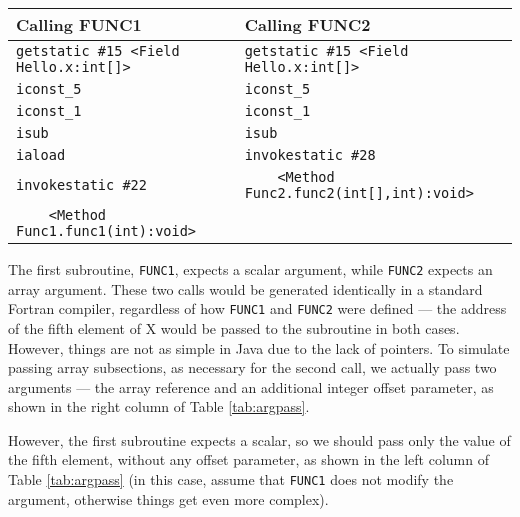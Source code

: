 \documentclass[11pt]{article}
\begin{document}
\begin{table*}[t]
\begin{center}
\begin{sffamily}
  \begin{tabular}{ll}
  \hline
  \textbf{Calling FUNC1} & \textbf{Calling FUNC2}\\ \hline
 \verb|getstatic #15 <Field Hello.x:int[]>|
 &  \verb|getstatic #15 <Field Hello.x:int[]>| \\

 \verb|iconst_5|
 &  \verb|iconst_5|  \\

 \verb|iconst_1|
 &  \verb|iconst_1|  \\

 \verb|isub|
 &  \verb|isub|  \\

 \verb|iaload|
 &  \verb|invokestatic #28|  \\

 \verb|invokestatic #22|
 &  \verb|    <Method Func2.func2(int[],int):void>|  \\

 \verb|    <Method Func1.func1(int):void>|
 &  \verb|| \\

  \hline
  \end{tabular}
\end{sffamily}
\end{center}
\caption{Differences in Argument Passing.}
\label{tab:argpass}
\end{table*}

The first subroutine, {\tt FUNC1}, expects a scalar argument,
while {\tt FUNC2} expects an array argument.
These two calls would be generated identically in a standard
Fortran compiler, regardless of how {\tt FUNC1} and
{\tt FUNC2} were defined --- the address of the fifth element of X
would be passed to the subroutine in both cases.  However, things
are not as simple in Java due to the lack of pointers.
To simulate passing array subsections, as necessary for the
second call, we actually pass two arguments --- the array
reference and an additional integer offset parameter, as shown
in the right column of Table \ref{tab:argpass}.

However, the first subroutine expects a scalar, so we should pass only the value
of the fifth element, without any offset parameter, as shown in the left column
of Table \ref{tab:argpass} (in this case, assume that {\tt FUNC1} does not
modify the argument, otherwise things get even more complex).
\end{document}
